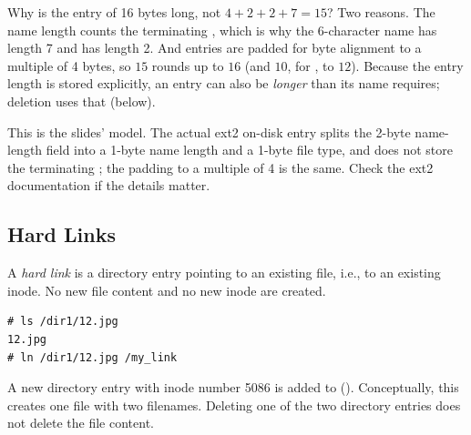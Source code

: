 Why is the entry of  16 bytes long, not $4 + 2 + 2 + 7 = 15$? Two reasons. The name length counts the terminating , which is why the 6-character name  has length 7 and  has length 2. And entries are padded for byte alignment to a multiple of 4 bytes, so $15$ rounds up to $16$ (and $10$, for , to $12$). Because the entry length is stored explicitly, an entry can also be \emph{longer} than its name requires; deletion uses that (below).

\begin{remark}
  This is the slides' model. The actual ext2 on-disk entry splits the 2-byte name-length field into a 1-byte name length and a 1-byte file type, and does not store the terminating ; the padding to a multiple of 4 is the same. Check the ext2 documentation if the details matter.
\end{remark}

\subsection{Hard Links}

\begin{definition}
  A \emph{hard link} is a directory entry pointing to an existing file, i.e., to an existing inode. No new file content and no new inode are created.
\end{definition}

\begin{example}
\begin{lstlisting}[style=sh]
# ls /dir1/12.jpg
12.jpg
# ln /dir1/12.jpg /my_link
\end{lstlisting}
  A new directory entry  with inode number 5086 is added to \code{/} (). Conceptually, this creates one file with two filenames. Deleting one of the two directory entries does not delete the file content.
\end{example}

